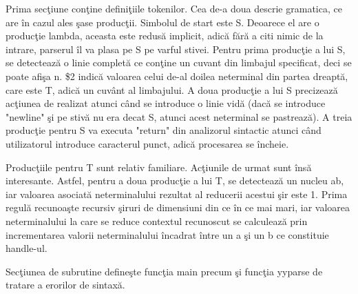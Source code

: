 Prima sec\c{t}iune con\c{t}ine defini\c{t}iile tokenilor. Cea de-a doua descrie gramatica, ce are \^{i}n cazul ales \c{s}ase produc\c{t}ii. Simbolul de start este S. Deoarece el are o produc\c{t}ie lambda, aceasta este redus\u{a} implicit, adic\u{a} f\u{a}r\u{a} a citi nimic de la intrare, parserul \^{i}l va plasa pe S pe varful stivei. Pentru prima produc\c{t}ie a lui S, se detecteaz\u{a} o linie complet\u{a} ce con\c{t}ine un cuvant din limbajul specificat, deci se poate afi\c{s}a n. \$2 indic\u{a} valoarea celui de-al doilea neterminal din partea dreapt\u{a}, care este T, adic\u{a} un cuv\^{a}nt al limbajului. A doua produc\c{t}ie a lui S precizeaz\u{a} ac\c{t}iunea de realizat atunci c\^{a}nd se introduce o linie vid\u{a} (dac\u{a} se introduce "newline" \c{s}i pe stiv\u{a} nu era decat S, atunci acest neterminal se pastreaz\u{a}). A treia produc\c{t}ie pentru S va executa "return" din analizorul sintactic atunci c\^{a}nd utilizatorul introduce caracterul punct, adic\u{a} procesarea se \^{i}ncheie.

Produc\c{t}iile pentru T sunt relativ familiare. Ac\c{t}iunile de urmat sunt \^{i}ns\u{a} interesante. Astfel, pentru a doua produc\c{t}ie a lui T, se detecteaz\u{a} un nucleu ab, iar valoarea asociat\u{a} neterminalului rezultat al reducerii acestui \c{s}ir este 1. Prima regul\u{a} recunoa\c{s}te recursiv \c{s}iruri de dimensiuni din ce \^{i}n ce mai mari, iar valoarea neterminalului la care se reduce contextul recunoscut se calculeaz\u{a} prin incrementarea valorii neterminalului \^{i}ncadrat \^{i}ntre un a \c{s}i un b ce constituie handle-ul.

Sec\c{t}iunea de subrutine define\c{s}te func\c{t}ia main precum \c{s}i func\c{t}ia yyparse de tratare a erorilor de sintax\u{a}.
